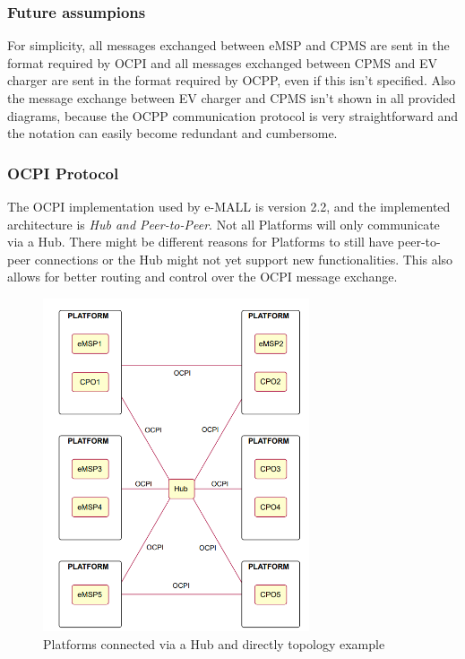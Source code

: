 \documentclass[12pt]{report}
\begin{document}
\subsubsection{Future assumpions}
For simplicity, all messages exchanged between eMSP and CPMS are sent in the format required by OCPI and all messages exchanged between CPMS and EV charger are sent in the format required by OCPP, even if this isn't specified.
Also the message exchange between EV charger and CPMS isn't shown in all provided diagrams, because the OCPP communication protocol is very straightforward and the notation can easily become redundant and cumbersome.

\subsubsection{OCPI Protocol}
The OCPI implementation used by e-MALL is version 2.2, and the implemented architecture is \emph{Hub and Peer-to-Peer}. Not all Platforms will only communicate via a Hub. There might be different reasons for Platforms to still have peer-to-peer
connections or the Hub might not yet support new functionalities. This also allows for better routing and control over the OCPI message exchange.


\begin{figure}[b]
    \centering
    \includegraphics[width =0.7\textwidth]{assets/Platforms connected via a Hub and directly topology example.png}
    \caption{Platforms connected via a Hub and directly topology example}
    \label{fig:my_label99}
\end{figure}
\clearpage
\end{document}
